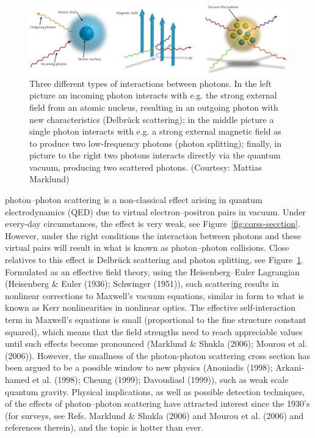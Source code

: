 \documentclass{article}
\begin{document}
\begin{figure}[!th]
	\centering
	\includegraphics[width=0.6\linewidth]{figures/photons.jpg}
	\caption{Three different types of interactions between photons. In the left picture an incoming photon interacts with e.g. the strong external field from an atomic nucleus, resulting in an outgoing photon with new characteristics (Delbrück scattering); in the middle picture a single photon interacts with e.g. a strong external magnetic field as to produce two low-frequency photons (photon splitting); finally, in picture to the right two photons interacts directly via the quantum vacuum, producing two scattered photons. (Courtesy: Mattias Marklund)}
	\label{fig:photon-types}
\end{figure}
photon–photon scattering is a non-classical effect arising in quantum electrodynamics (QED) due to virtual electron–positron pairs in vacuum. Under every-day circumstances, the effect is very weak, see Figure~\ref{fig:corss-secction}. However, under the right conditions the interaction between photons and these virtual pairs will result in what is known as photon–photon collisions. Close relatives to this effect is Delbrück scattering and photon splitting, see Figure~\ref{fig:photon-types}. Formulated as an effective field theory, using the Heisenberg–Euler Lagrangian (Heisenberg \& Euler (1936); Schwinger (1951)), such scattering results in nonlinear corrections to Maxwell’s vacuum equations, similar in form to what is known as Kerr nonlinearities in nonlinear optics.
The effective self-interaction term in Maxwell’s equations is small (proportional to the fine structure constant squared), which means that the field strengths need to reach appreciable values until such effects become pronounced (Marklund \& Shukla (2006); Mourou et al. (2006)). However, the smallness of the photon-photon scattering cross section has been argued to be a possible window to new physics (Anoniadis (1998); Arkani-hamed et al. (1998); Cheung (1999); Davoudiasl (1999)), such as weak scale quantum gravity. Physical implications, as well as possible detection techniques, of the effects of photon–photon scattering have attracted interest since the 1930’s (for surveys, see Refs. Marklund \& Shukla (2006) and Mourou et al. (2006) and references therein), and the topic is hotter than ever.
\end{document}

